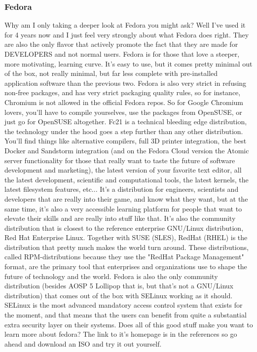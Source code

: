 \documentclass[paper=a4, fontsize=10pt]{scrartcl} %
\numberwithin{equation}{section} %
\numberwithin{figure}{section} %
\numberwithin{table}{section} %
\begin{document}
\subsubsection{Fedora\cite{fedora}}
Why am I only taking a deeper look at Fedora you might ask? Well I've used it
for 4 years now and I just feel very strongly about what Fedora does right.
They are also the only flavor that actively promote the fact that they are
made for DEVELOPERS and not normal users.
\newline
\newline
Fedora is for those that love a steeper, more motivating, learning curve. It's
easy to use, but it comes pretty minimal out of the box, not really minimal,
but far less complete with pre-installed application software than the previous
two. Fedora is also very strict in refusing non-free packages, and has very
strict packaging quality rules, so for instance, Chromium is not allowed in the
official Fedora repos. So for Google Chromium lovers, you'll have to compile
yourselves, use the packages from OpenSUSE\cite{suse}, or just go for OpenSUSE altogether.
\newline
\newline
Fc21 is a technical bleeding edge distribution, the technology under the hood goes a
step further than any other distribution. You'll find things like alternative
compilers, full 3D printer integration, the best Docker\cite{docker} and
Sandstorm\cite{sandstorm}
integration (and on the Fedora Cloud version the Atomic server functionality
for those that really want to taste the future of software development and
marketing), the latest version of your favorite text editor, all the latest
development, scientific and computational tools, the latest kernels, the latest filesystem features, etc...
\newline
\newline
It's a distribution for engineers, scientists and developers that are really into
their game, and know what they want, but at the same time, it's also a very
accessible learning platform for people that want to elevate their skills and
are really into stuff like that. It's also the community distribution that is closest
to the reference enterprise GNU/Linux distribution, Red Hat Enterprise Linux.
Together with SUSE (SLES)\cite{suse}, RedHat (RHEL)\cite{redhat} is the distribution that pretty much makes
the world turn around. These distributions, called RPM-distributions because they use the
"RedHat Package Management" format, are the primary tool that enterprises and
organizations use to shape the future of technology and the world. Fedora is
also the only community distribution (besides AOSP 5 Lollipop that is, but that's not
a GNU/Linux distribution) that comes out of the box with SELinux working as it
should. SELinux\cite{selinux} is the most advanced mandatory access control system that
exists for the moment, and that means that the users can benefit from quite a
substantial extra security layer on their systems.
\newline
\newline
Does all of this good stuff make you want to learn more about fedora? The link
to it's homepage is in the references so go ahead and download an ISO and try
it out yourself. 
\end{document}
